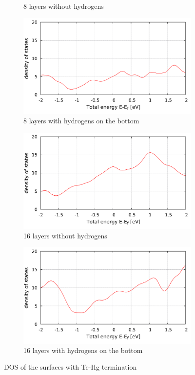 \begin{figure}[tbp]
\begin{subfigure}[c]{.48\linewidth}
			\caption{8 layers without hydrogens}
		\end{subfigure}
		\hfill
		\begin{subfigure}[c]{.48\linewidth}
			\centering
			\includegraphics[width=\linewidth]{Te_and_Hg_termination/DOS_8_layers_-2_2.pdf}
			\caption{8 layers with hydrogens on the bottom}
		\end{subfigure}
		\begin{subfigure}[c]{.48\linewidth}
			\centering 
			\includegraphics[width=\linewidth]{Te_and_Hg_termination/no_H_DOS_16_layers_-2_2.pdf}
			\caption{16 layers without hydrogens} \label{}
		\end{subfigure}
		\hfill
		\begin{subfigure}[c]{.48\linewidth}
			\centering
			\includegraphics[width=\linewidth]{Te_and_Hg_termination/DOS_16_layers_-2_2.pdf}
			\caption{16 layers with hydrogens on the bottom}
		\end{subfigure}
		\caption{DOS of the surfaces with Te-Hg termination} 
		\label{dos_surface_even_layers}
	\end{figure}

